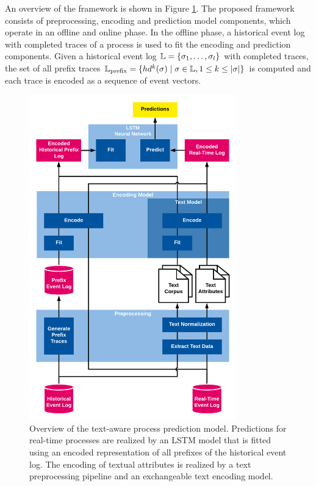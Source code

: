 An overview of the framework is shown in Figure \ref{fig:framework}.
The proposed framework consists of preprocessing, encoding and prediction model components, which operate in an offline and online phase.
In the offline phase, a historical event log with completed traces of a process is used to fit the encoding and prediction components.
Given a historical event log $\mathbb{L} = \{\sigma_1, \dots, \sigma_l\}$ with completed traces, the set of all prefix traces $\mathbb{L}_\mathrm{prefix} = \{ hd^k(\sigma) \mid  \sigma \in \mathbb{L}, 1 \leq k \leq |\sigma|\}$ is computed and each trace is encoded as a sequence of event vectors.

\begin{figure}[!htbp]
	\centering
	\includegraphics[width=0.8\textwidth]{figures/framework}
	\caption[Overview of the text-aware process prediction model]{Overview of the text-aware process prediction model. Predictions for real-time processes are realized by an LSTM model that is fitted using an encoded representation of all prefixes of the historical event log. The encoding of textual attributes is realized by a text preprocessing pipeline and an exchangeable text encoding model.}
	\label{fig:framework}
\end{figure}

